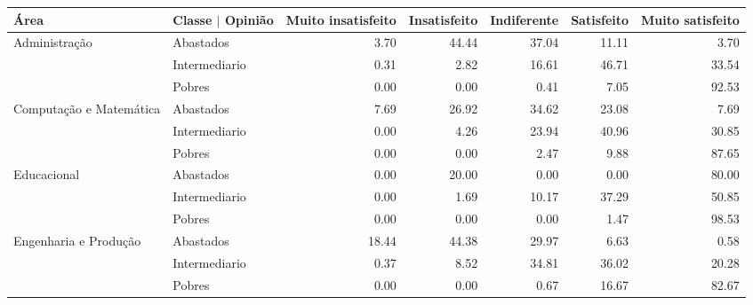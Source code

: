 \begin{table}[ht]
\scriptsize
\centering
\begin{tabular}{ll rrrrr}
  \toprule
 Área                    & Classe $\vert$ Opinião & \multicolumn{1}{l}{ Muito insatisfeito} & \multicolumn{1}{l}{ Insatisfeito} & \multicolumn{1}{l}{ Indiferente} & \multicolumn{1}{l}{ Satisfeito} & \multicolumn{1}{l}{ Muito satisfeito} \\ 
   \midrule
Administração           & Abastados               &               3.70 &        44.44 &       37.04 &      11.11 &             3.70 \\ 
                          & Intermediario           &               0.31 &         2.82 &       16.61 &      46.71 &            33.54 \\ 
                          & Pobres                  &               0.00 &         0.00 &        0.41 &       7.05 &            92.53 \\ 
  Computação e Matemática & Abastados               &               7.69 &        26.92 &       34.62 &      23.08 &             7.69 \\ 
                          & Intermediario           &               0.00 &         4.26 &       23.94 &      40.96 &            30.85 \\ 
                          & Pobres                  &               0.00 &         0.00 &        2.47 &       9.88 &            87.65 \\ 
  Educacional             & Abastados               &               0.00 &        20.00 &        0.00 &       0.00 &            80.00 \\ 
                          & Intermediario           &               0.00 &         1.69 &       10.17 &      37.29 &            50.85 \\ 
                          & Pobres                  &               0.00 &         0.00 &        0.00 &       1.47 &            98.53 \\ 
  Engenharia e Produção   & Abastados               &              18.44 &        44.38 &       29.97 &       6.63 &             0.58 \\ 
                          & Intermediario           &               0.37 &         8.52 &       34.81 &      36.02 &            20.28 \\ 
                          & Pobres                  &               0.00 &         0.00 &        0.67 &      16.67 &            82.67 \\ 

\end{tabular}
\end{table}
